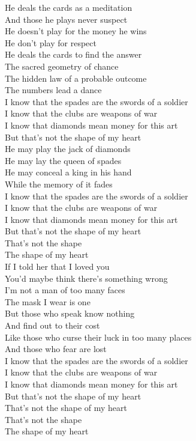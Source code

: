 
He deals the cards as a meditation\\
And those he plays never suspect\\
He doesn't play for the money he wins\\
He don't play for respect\\
He deals the cards to find the answer\\
The sacred geometry of chance\\
The hidden law of a probable outcome\\
The numbers lead a dance\\
\hops
{} I know that the spades are the swords of a soldier\\
 I know that the clubs are weapons of war\\
 I know that diamonds mean money for this art\\
 But that's not the shape of my heart\\
\hops
He may play the jack of diamonds\\
He may lay the queen of spades\\
He may conceal a king in his hand\\
While the memory of it fades\\
\hops
{} I know that the spades are the swords of a soldier\\
 I know that the clubs are weapons of war\\
 I know that diamonds mean money for this art\\
 But that's not the shape of my heart\\
 That's not the shape\\
 The shape of my heart\\
\hops
If I told her that I loved you\\
You'd maybe think there's something wrong\\
I'm not a man of too many faces\\
The mask I wear is one\\
But those who speak know nothing\\
And find out to their cost\\
Like those who curse their luck in too many places\\
And those who fear are lost\\
\hops
{} I know that the spades are the swords of a soldier\\
 I know that the clubs are weapons of war\\
 I know that diamonds mean money for this art\\
 But that's not the shape of my heart\\
 That's not the shape of my heart\\
 That's not the shape\\
 The shape of my heart